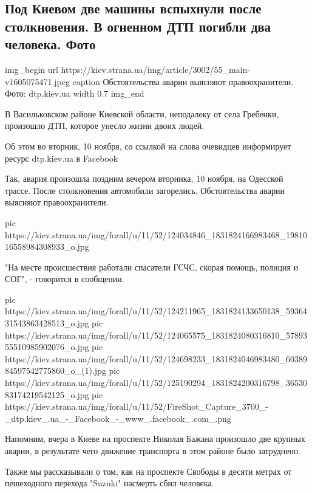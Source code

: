  
 
 

\subsection{Под Киевом две машины вспыхнули после столкновения. В огненном ДТП погибли два человека. Фото}

\ifcmt
img_begin 
	url https://kiev.strana.ua/img/article/3002/55_main-v1605075471.jpeg
	caption Обстоятельства аварии выясняют правоохранители. Фото: dtp.kiev.ua 
	width 0.7
img_end
\fi

В Васильковском районе Киевской области, неподалеку от села Гребенки, произошло
ДТП, которое унесло жизни двоих людей.

Об этом во вторник, 10 ноября, со ссылкой на слова очевидцев информирует ресурс
dtp.kiev.ua в Facebook

Так, авария произошла поздним вечером вторника, 10 ноября, на Одесской трассе.
После столкновения автомобили загорелись. Обстоятельства аварии выясняют
правоохранители.

\ifcmt
pic https://kiev.strana.ua/img/forall/u/11/52/124034846_1831824166983468_1981016558984308933_o.jpg
\fi

"На месте происшествия работали спасатели ГСЧС, скорая помощь, полиция и СОГ",
- говорится в сообщении.

\ifcmt
pic https://kiev.strana.ua/img/forall/u/11/52/124211965_1831824133650138_5936431543863428513_o.jpg
pic https://kiev.strana.ua/img/forall/u/11/52/124065575_1831824080316810_5789355510985902076_o.jpg
pic https://kiev.strana.ua/img/forall/u/11/52/124698233_1831824046983480_6038984597542775860_o_(1).jpg
pic https://kiev.strana.ua/img/forall/u/11/52/125190294_1831824200316798_3653083174219542125_o.jpg
pic https://kiev.strana.ua/img/forall/u/11/52/FireShot_Capture_3700_-_dtp.kiev_.ua_-_Facebook_-_www_.facebook_.com_.png
\fi

Напомним, вчера в Киеве на проспекте Николая Бажана произошло две крупных
аварии, в результате чего движение транспорта в этом районе было затруднено.

Также мы рассказывали о том, как на проспекте Свободы в десяти метрах от
пешеходного перехода "Suzuki" насмерть сбил человека.
